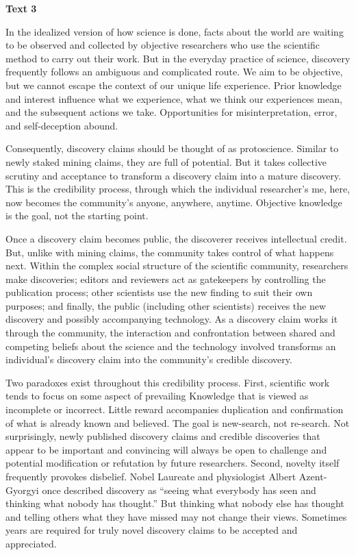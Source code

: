 \begin{center}\textbf{Text 3}\end{center}

In the idealized version of how science is done, facts about the world are waiting to be observed and collected by objective researchers who use the scientific method to carry out their work. But in the everyday practice of science, discovery frequently follows an ambiguous and complicated route. We aim to be objective, but we cannot escape the context of our unique life experience. Prior knowledge and interest influence what we experience, what we think our experiences mean, and the subsequent actions we take. Opportunities for misinterpretation, error, and self-deception abound.

Consequently, discovery claims should be thought of as protoscience. Similar to newly staked mining claims, they are full of potential. But it takes collective scrutiny and acceptance to transform a discovery claim into a mature discovery. This is the credibility process, through which the individual researcher’s me, here, now becomes the community’s anyone, anywhere, anytime. Objective knowledge is the goal, not the starting point.

Once a discovery claim becomes public, the discoverer receives intellectual credit. But, unlike with mining claims, the community takes control of what happens next. Within the complex social structure of the scientific community, researchers make discoveries; editors and reviewers act as gatekeepers by controlling the publication process; other scientists use the new finding to suit their own purposes; and finally, the public (including other scientists) receives the new discovery and possibly accompanying technology. As a discovery claim works it through the community, the interaction and confrontation between shared and competing beliefs about the science and the technology involved transforms an individual’s discovery claim into the community’s credible discovery.

Two paradoxes exist throughout this credibility process. First, scientific work tends to focus on some aspect of prevailing Knowledge that is viewed as incomplete or incorrect. Little reward accompanies duplication and confirmation of what is already known and believed. The goal is new-search, not re-search. Not surprisingly, newly published discovery claims and credible discoveries that appear to be important and convincing will always be open to challenge and potential modification or refutation by future researchers. Second, novelty itself frequently provokes disbelief. Nobel Laureate and physiologist Albert Azent-Gyorgyi once described discovery as “seeing what everybody has seen and thinking what nobody has thought.” But thinking what nobody else has thought and telling others what they have missed may not change their views. Sometimes years are required for truly novel discovery claims to be accepted and appreciated.

